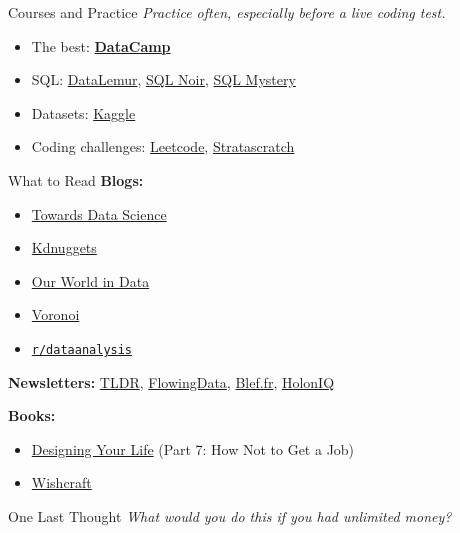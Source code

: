 \documentclass[10pt,a4paper]{article}
\begin{document}
\begin{multicols}{3}
\begin{textboxYellow}{Courses and Practice}
\emph{Practice often, especially before a live coding test.}

\begin{itemize}
    \item The best: \href{https://datacamp.com/}{\textbf{DataCamp}}
    \item SQL: \href{https://datalemur.com/}{DataLemur}, \href{https://www.sqlnoir.com/}{SQL Noir}, \href{https://mystery.knightlab.com/}{SQL Mystery}
    \item Datasets: \href{https://www.kaggle.com/}{Kaggle}
    \item Coding challenges: \href{https://leetcode.com/}{Leetcode}, \href{https://www.stratascratch.com/}{Stratascratch}
\end{itemize}
\end{textboxYellow}

\begin{textboxYellow}{What to Read}
\textbf{Blogs:}
\begin{itemize}
    \item \href{https://towardsdatascience.com/}{Towards Data Science}
    \item \href{https://www.kdnuggets.com/}{Kdnuggets}
    \item \href{https://ourworldindata.org/}{Our World in Data}
    \item \href{https://www.voronoiapp.com/}{Voronoi}
    \item \href{https://reddit.com/r/dataanalysis/}{\texttt{r/dataanalysis}}
\end{itemize}
\textbf{Newsletters:} \href{https://tldr.tech/newsletters}{TLDR}, \href{https://flowingdata.com/newsletter/}{FlowingData}, \href{https://www.blef.fr/}{Blef.fr}, \href{https://www.holoniq.com/newsletters}{HolonIQ}

\textbf{Books:}
\begin{itemize}
    \item \href{https://www.amazon.com/Designing-Your-Life-Well-Lived-Joyful/dp/1101923083}{Designing Your Life} (Part 7: How Not to Get a Job)
    \item \href{https://www.amazon.com/Wishcraft-How-What-Really-Want/dp/0345465180}{Wishcraft}
\end{itemize}
\end{textboxYellow}

\begin{textbox}{One Last Thought}
\emph{What would you do this if you had unlimited money?}
\end{textbox}
\date{\today}
\end{multicols}
\end{document}

